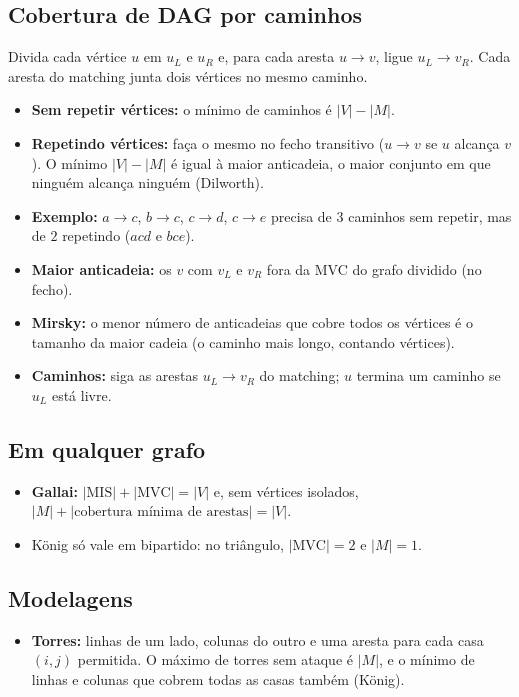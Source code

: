 \subsection*{Cobertura de DAG por caminhos}

Divida cada vértice $u$ em $u_L$ e $u_R$ e, para cada aresta $u \to v$, ligue $u_L \to v_R$. Cada aresta do
matching junta dois vértices no mesmo caminho.
\begin{itemize}
  \item \textbf{Sem repetir vértices:} o mínimo de caminhos é $|V| - |M|$.
  \item \textbf{Repetindo vértices:} faça o mesmo no fecho transitivo ($u \to v$ se $u$ alcança $v$). O mínimo
        $|V| - |M|$ é igual à maior anticadeia, o maior conjunto em que ninguém alcança ninguém (Dilworth).
  \item \textbf{Exemplo:} $a \to c$, $b \to c$, $c \to d$, $c \to e$ precisa de $3$ caminhos sem repetir, mas de
        $2$ repetindo ($acd$ e $bce$).
  \item \textbf{Maior anticadeia:} os $v$ com $v_L$ e $v_R$ fora da MVC do grafo dividido (no fecho).
  \item \textbf{Mirsky:} o menor número de anticadeias que cobre todos os vértices é o tamanho da maior cadeia
        (o caminho mais longo, contando vértices).
  \item \textbf{Caminhos:} siga as arestas $u_L \to v_R$ do matching; $u$ termina um caminho se $u_L$ está livre.
\end{itemize}

\subsection*{Em qualquer grafo}

\begin{itemize}
  \item \textbf{Gallai:} $|\text{MIS}| + |\text{MVC}| = |V|$ e, sem vértices isolados,
        $|M| + |\text{cobertura mínima de arestas}| = |V|$.
  \item König só vale em bipartido: no triângulo, $|\text{MVC}| = 2$ e $|M| = 1$.
\end{itemize}

\subsection*{Modelagens}

\begin{itemize}
  \item \textbf{Torres:} linhas de um lado, colunas do outro e uma aresta para cada casa $(i, j)$ permitida. O
        máximo de torres sem ataque é $|M|$, e o mínimo de linhas e colunas que cobrem todas as casas também (König).
\end{itemize}
